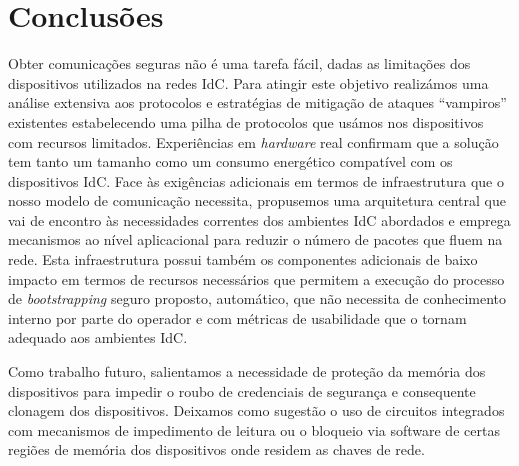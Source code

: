 \documentclass{llncs}
\begin{document}
\section{Conclusões}
\label{sec:conclusion}
Obter comunicações seguras não é uma tarefa fácil, dadas as limitações dos dispositivos utilizados na redes \ac{IdC}. 
Para atingir este objetivo realizámos uma análise extensiva aos protocolos e estratégias de mitigação de ataques ``vampiros'' existentes estabelecendo uma pilha de protocolos que usámos nos dispositivos com recursos limitados. 
Experiências em \textit{hardware} real confirmam que 
a solução tem tanto um tamanho como um consumo energético compatível com os dispositivos \ac{IdC}.
Face às exigências adicionais em termos de infraestrutura que o nosso modelo de comunicação necessita, propusemos uma arquitetura central que vai de encontro às necessidades correntes dos ambientes \ac{IdC} abordados e emprega mecanismos ao nível aplicacional para reduzir o número de pacotes que fluem na rede. 
Esta infraestrutura possui também os componentes adicionais de baixo impacto em termos de recursos necessários que permitem a execução do processo de \textit{bootstrapping} seguro proposto, 
automático, que não necessita de conhecimento interno por parte do operador e com métricas de usabilidade que o tornam adequado aos ambientes \ac{IdC}.

Como trabalho futuro, salientamos a necessidade de proteção da memória dos dispositivos para impedir o roubo de credenciais de segurança e consequente clonagem dos dispositivos. Deixamos como sugestão o uso de circuitos integrados com mecanismos de impedimento de leitura ou o bloqueio via software de certas regiões de memória dos dispositivos onde residem as chaves de rede.
%



\end{document}
